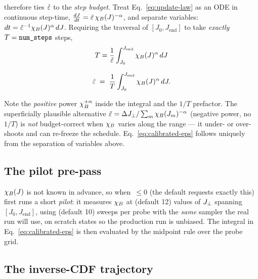 \qv{} therefore ties $\tilde{\varepsilon}$ to the \emph{step budget}. Treat
Eq.~\eqref{eq:update-law} as an ODE in continuous step-time,
$\frac{dJ}{dt}=\tilde{\varepsilon}\,\chi_B(J)^{-\alpha}$, and separate variables:
$dt=\tilde{\varepsilon}^{-1}\chi_B(J)^{\alpha}\,dJ$. Requiring the traversal of
$[J_0,J_{\mathrm{end}}]$ to take \emph{exactly} $T=\code{num\_steps}$ steps,
\begin{equation}
T=\frac{1}{\tilde{\varepsilon}}\int_{J_0}^{J_{\mathrm{end}}}\chi_B(J)^{\alpha}\,dJ
\end{equation}

\begin{keyeq}
\begin{equation}
\tilde{\varepsilon} \;=\; \frac{1}{T}\int_{J_0}^{J_{\mathrm{end}}}\chi_B(J)^{\alpha}\,dJ .
\label{eq:calibrated-eps}
\end{equation}
\end{keyeq}

\begin{warnbox}
Note the \emph{positive} power $\chi_B^{+\alpha}$ inside the integral and the
$1/T$ prefactor. The superficially plausible alternative
$\tilde{\varepsilon}=\Delta J_{\perp}/\sum_m\chi_B(J_m)^{-\alpha}$ (negative power, no $1/T$) is
\emph{not} budget-correct when $\chi_B$ varies along the range --- it under- or
over-shoots and can re-freeze the schedule. Eq.~\eqref{eq:calibrated-eps}
follows uniquely from the separation of variables above.
\end{warnbox}

\subsection{The pilot pre-pass}

$\chi_B(J)$ is not known in advance, so when \,$\le0$
(the default  requests exactly this)
 first runs a short \emph{pilot}: it measures $\chi_B$ at
 (default 12) values of $J_{\perp}$ spanning
$[J_0,J_{\mathrm{end}}]$, using  (default 10) sweeps per
probe with the \emph{same} sampler the real run will use, on scratch states
so the production run is unbiased. The integral in
Eq.~\eqref{eq:calibrated-eps} is then evaluated by the midpoint rule over
the probe grid.

\subsection{The inverse-CDF trajectory}

